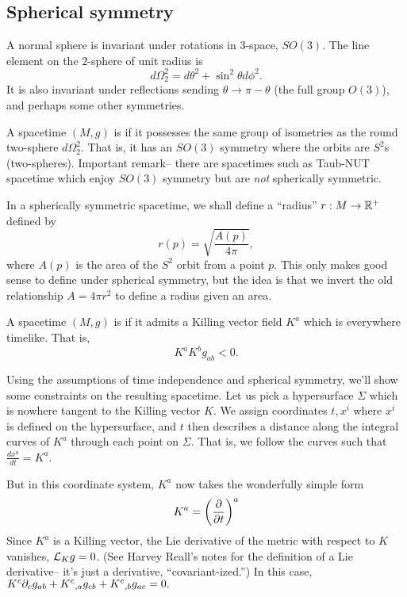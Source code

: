 \subsection*{Spherical symmetry} A normal sphere is invariant under rotations in $3$-space, $SO(3)$. The line element on the $2$-sphere of unit radius is
\begin{equation*}
    d\Omega_2^2 = d\theta^2 +\sin^2\theta d\phi^2.
\end{equation*}
It is also invariant under reflections sending $\theta\to \pi-\theta$ (the full group $O(3)$), and perhaps some other symmetries.

\begin{defn}
A spacetime $(M,g)$ is  if it possesses the same group of isometries as the round two-sphere $d\Omega_2^2$. That is, it has an $SO(3)$ symmetry where the orbits are $S^2$s (two-spheres). Important remark-- there are spacetimes such as Taub-NUT spacetime which enjoy $SO(3)$ symmetry but are \emph{not} spherically symmetric.
\end{defn}

In a spherically symmetric spacetime, we shall define a ``radius'' $r:M\to \RR^+$ defined by 
\begin{equation*}
    r(p) =\sqrt{\frac{A(p)}{4\pi}},
\end{equation*}
where $A(p)$ is the area of the $S^2$ orbit from a point $p$. This only makes good sense to define under spherical symmetry, but the idea is that we invert the old relationship $A=4\pi r^2$ to define a radius given an area.

\begin{defn}
    A spacetime $(M,g)$ is  if it admits a Killing vector field $K^a$ which is everywhere timelike. That is,
    \begin{equation*}
        K^a K^b g_{ab} < 0.
    \end{equation*}
\end{defn}

Using the assumptions of time independence and spherical symmetry, we'll show some constraints on the resulting spacetime. Let us pick a hypersurface $\Sigma$ which is nowhere tangent to the Killing vector $K$. We assign coordinates $t,x^i$ where $x^i$ is defined on the hypersurface, and $t$ then describes a distance along the integral curves of $K^a$ through each point on $\Sigma$. That is, we follow the curves such that $\frac{dx^a}{dt}=K^a$.

But in this coordinate system, $K^a$ now takes the wonderfully simple form \begin{equation*}
    K^a= \left(\P{}{t}\right)^a
\end{equation*}
Since $K^a$ is a Killing vector, the Lie derivative of the metric with respect to $K$ vanishes,
$\cL_K g=0$. (See Harvey Reall's notes for the definition of a Lie derivative-- it's just a derivative, ``covariant-ized.'') In this case, $K^c \p_c g_{ab}+K^c{}_{,a} g_{cb}+K^c{}_{,b}g_{ac}=0.$

